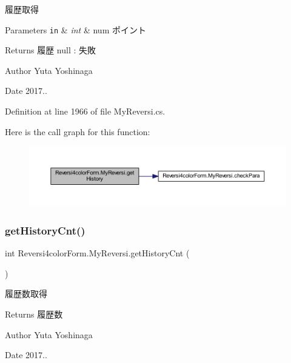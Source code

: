 履歴取得 


\begin{DoxyParams}[1]{Parameters}
\mbox{\tt in}  & {\em int} & num ポイント \\
\hline
\end{DoxyParams}
\begin{DoxyReturn}{Returns}
履歴 null \+: 失敗 
\end{DoxyReturn}
\begin{DoxyAuthor}{Author}
Yuta Yoshinaga 
\end{DoxyAuthor}
\begin{DoxyDate}{Date}
2017.. 
\end{DoxyDate}


Definition at line 1966 of file My\+Reversi.\+cs.

Here is the call graph for this function\+:
\nopagebreak
\begin{figure}[H]
\begin{center}
\leavevmode
\includegraphics[width=350pt]{class_reversi4color_form_1_1_my_reversi_a6765e90e98f20c7a19a941400446d006_cgraph}
\end{center}
\end{figure}
\mbox{\label{class_reversi4color_form_1_1_my_reversi_a9d4345e1a06f0d94f073f82037aa6113}} 
\subsubsection{\texorpdfstring{get\+History\+Cnt()}{getHistoryCnt()}}
{\footnotesize\ttfamily int Reversi4color\+Form.\+My\+Reversi.\+get\+History\+Cnt (\begin{DoxyParamCaption}{ }\end{DoxyParamCaption})}



履歴数取得 

\begin{DoxyReturn}{Returns}
履歴数 
\end{DoxyReturn}
\begin{DoxyAuthor}{Author}
Yuta Yoshinaga 
\end{DoxyAuthor}
\begin{DoxyDate}{Date}
2017.. 
\end{DoxyDate}


